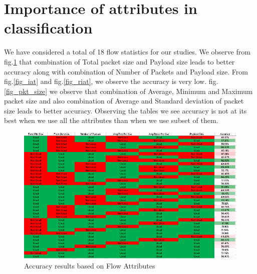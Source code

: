 \documentclass[conference]{IEEEtran}
\begin{document}
\section{Importance of attributes in classification}
We have considered a total of 18 flow statistics for our studies.
We observe from fig.\ref{fig_flow} that combination of Total packet size and Payload size leads to better accuracy along with combination of Number of Packets and Payload size. From fig.\ref{fig_iat} and fig.\ref{fig_riat}, we observe the accuracy is very low. fig.\ref{fig_pkt_size} we observe that combination of Average, Minimum and Maximum packet size and also combination of Average and Standard deviation of packet size leads to better accuracy. Observing the tables we see accuracy is not at its best when we use all the attributes than when we use subset of them. 
\begin{figure}[!t]
	\centering
	\includegraphics[width=7.16in]{flow}
	\caption{Accuracy results based on Flow Attributes}
	\label{fig_flow}
\end{figure}
\end{document}
